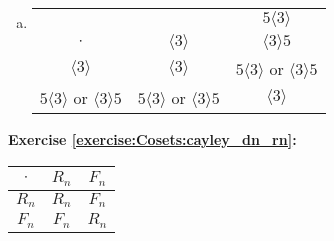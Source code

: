 \begin{enumerate}[(a)]
\item
\begin{center}
\begin{tabular}{c|cc}
                         & & $5 \langle 3 \rangle$ \\
$\cdot$             & $\langle 3\rangle$ & $\langle 3 \rangle 5$ \\\hline
$\langle 3\rangle$ & $\langle 3 \rangle$ & $5 \langle 3 \rangle$ or $\langle 3 \rangle 5$ \\
$5 \langle 3 \rangle$ or $\langle 3 \rangle 5$ & $5 \langle 3 \rangle$ or $\langle 3 \rangle 5$ & $\langle 3\rangle$\\

\end{tabular}
\end{center}
\end{enumerate}

\noindent\textbf{Exercise \ref{exercise:Cosets:cayley_dn_rn}:}
\begin{center}
\begin{tabular}{c|cc}
$\cdot$             & $R_n$ & $F_n$ \\\hline
$R_n$ & $R_n$ & $F_n$ \\
$F_n$ & $F_n$ & $R_n$\\

\end{tabular}
\end{center}

